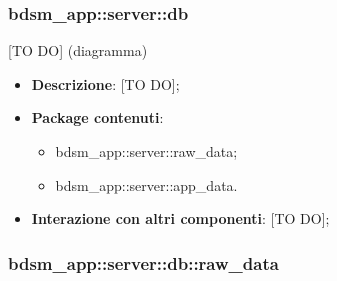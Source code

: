 

\subsubsection{bdsm\_app::server::db} %
\label{ssub:bdsm_app_server_db}
	[TO DO] (diagramma) \newline \newline

	\begin{itemize}
		\item \textbf{Descrizione}: [TO DO];
		\item \textbf{Package contenuti}:
			\begin{itemize}
				\item bdsm\_app::server::raw\_data;
				\item bdsm\_app::server::app\_data.
			\end{itemize}
		\item \textbf{Interazione con altri componenti}: [TO DO];
	\end{itemize}



\subsubsection{bdsm\_app::server::db::raw\_data} %
\label{ssub:bdsm_app_server_raw_model}

